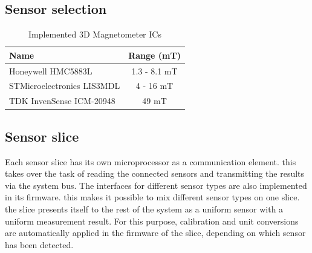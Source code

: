 \documentclass[conference]{IEEEtran}
\begin{document}
\subsection{Sensor selection}


\begin{table}
    \centering
    \begin{tabular}{|l|c|}
    \hline
    \textbf{Name} & \textbf{Range (mT)} \\
    \hline
    Honeywell HMC5883L & 1.3 - 8.1 mT \\
    STMicroelectronics LIS3MDL & 4 - 16 mT \\
    TDK InvenSense ICM-20948 & 49 mT \\
    \hline
    \end{tabular}
    \caption{Implemented 3D Magnetometer ICs}
\end{table}


\subsection{Sensor slice}

Each sensor slice has its own microprocessor as a communication element. this takes over the task of reading the connected sensors and transmitting the results via the system bus.
The interfaces for different sensor types are also implemented in its firmware. this makes it possible to mix different sensor types on one slice. the slice presents itself to the rest of the system as a uniform sensor with a uniform measurement result.
For this purpose, calibration and unit conversions are automatically applied in the firmware of the slice, depending on which sensor has been detected.
\end{document}
